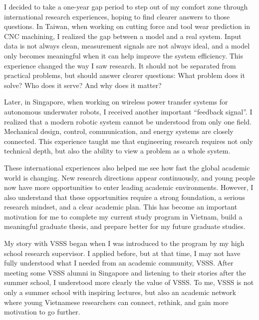 \documentclass[11pt, a4paper]{src/awesome-cv}
\begin{document}
\vspace{0.18cm}

I decided to take a one-year gap period to step out of my comfort zone through international research experiences, hoping to find clearer answers to those questions. In Taiwan, when working on cutting force and tool wear prediction in CNC machining, I realized the gap between a model and a real system. Input data is not always clean, measurement signals are not always ideal, and a model only becomes meaningful when it can help improve the system efficiency. This experience changed the way I saw research. It should not be separated from practical problems, but should answer clearer questions: What problem does it solve? Who does it serve? And why does it matter?

\vspace{0.18cm}

Later, in Singapore, when working on wireless power transfer systems for autonomous underwater robots, I received another important “feedback signal”. I realized that a modern robotic system cannot be understood from only one field. Mechanical design, control, communication, and energy systems are closely connected. This experience taught me that engineering research requires not only technical depth, but also the ability to view a problem as a whole system.

\vspace{0.18cm}

These international experiences also helped me see how fast the global academic world is changing. New research directions appear continuously, and young people now have more opportunities to enter leading academic environments. However, I also understand that these opportunities require a strong foundation, a serious research mindset, and a clear academic plan. This has become an important motivation for me to complete my current study program in Vietnam, build a meaningful graduate thesis, and prepare better for my future graduate studies.

\vspace{0.18cm}

My story with VSSS began when I was introduced to the program by my high school research supervisor. I applied before, but at that time, I may not have fully understood what I needed from an academic community, VSSS. After meeting some VSSS alumni in Singapore and listening to their stories after the summer school, I understood more clearly the value of VSSS. To me, VSSS is not only a summer school with inspiring lectures, but also an academic network where young Vietnamese researchers can connect, rethink, and gain more motivation to go further.
\end{document}

